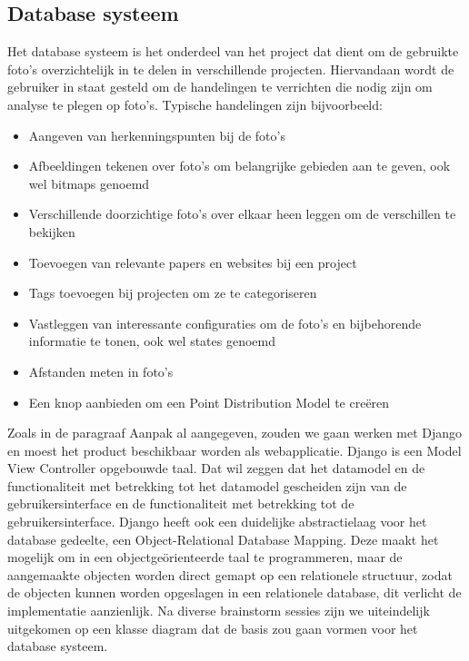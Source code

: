 \subsection{Database systeem}
\label{aanpak_database_systeem}
Het database systeem is het onderdeel van het project dat dient om de gebruikte foto's overzichtelijk in te delen in verschillende projecten. Hiervandaan wordt de gebruiker in staat gesteld om de handelingen te verrichten die nodig zijn om analyse te plegen op foto's. Typische handelingen zijn bijvoorbeeld: 

\begin{itemize}
\item Aangeven van herkenningspunten bij de foto's
\item Afbeeldingen tekenen over foto's om belangrijke gebieden aan te geven, ook wel bitmaps genoemd
\item Verschillende doorzichtige foto's over elkaar heen leggen om de verschillen te bekijken
\item Toevoegen van relevante papers en websites bij een project
\item Tags toevoegen bij projecten om ze te categoriseren
\item Vastleggen van interessante configuraties om de foto's en bijbehorende informatie te tonen, ook wel states genoemd
\item Afstanden meten in foto's
\item Een knop aanbieden om een Point Distribution Model te cre\"{e}ren
\end{itemize}

Zoals in de paragraaf Aanpak al aangegeven, zouden we gaan werken met Django en moest het product beschikbaar worden als webapplicatie. Django is een Model View Controller opgebouwde taal. Dat wil zeggen dat het datamodel en de functionaliteit met betrekking tot het datamodel gescheiden zijn van de gebruikersinterface en de functionaliteit met betrekking tot de gebruikersinterface. Django heeft ook een duidelijke abstractielaag voor het database gedeelte, een Object-Relational Database Mapping. Deze maakt het mogelijk om in een object\-ge\"{o}rienteerde taal te programmeren, maar de aangemaakte objecten worden direct gemapt op een relationele structuur, zodat de objecten kunnen worden opgeslagen in een relationele database, dit verlicht de implementatie aanzienlijk. Na diverse brainstorm sessies zijn we uiteindelijk uitgekomen op een klasse diagram\pageref{Databasediagram} dat de basis zou gaan vormen voor het database systeem.


